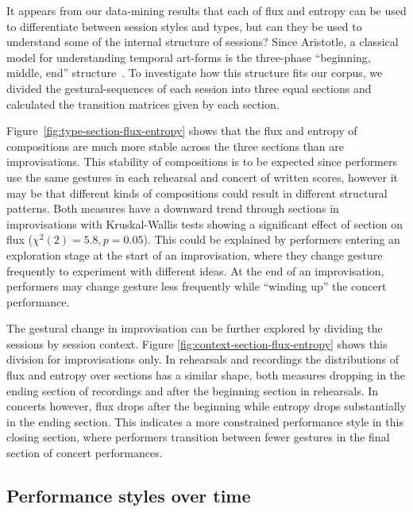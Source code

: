 \documentclass{sigchi}
\begin{document}
It appears from our data-mining results that each of flux and entropy can be used to
differentiate between session styles and types, but can they be
used to understand some of the internal structure of sessions? Since Aristotle, a
classical model for understanding temporal art-forms is the three-phase
``beginning, middle, end'' structure~\cite{Aristotle:350rt}. To
investigate how this structure fits our corpus, we divided the
gestural-sequences of each session into three equal sections and calculated the
transition matrices given by each section.

Figure~\ref{fig:type-section-flux-entropy} shows that the flux and
entropy of compositions are much more stable across the three sections than  are
improvisations. This stability of compositions is to be
expected since performers use the same gestures in each rehearsal and
concert of written scores, however it may be that different
kinds of compositions could result in different structural
patterns. Both measures have a downward trend through sections in
improvisations with Kruskal-Wallis tests showing a significant effect
of section on flux ($\chi^2(2)=5.8, p=0.05$). This could be explained
by performers entering an exploration stage at the start of an
improvisation, where they change gesture frequently to experiment with
different ideas. At the end of an improvisation, performers may change
gesture less frequently while ``winding up'' the concert performance.

The gestural change in improvisation can be further explored by
dividing the sessions by session context. Figure
\ref{fig:context-section-flux-entropy} shows this division for
improvisations only. In rehearsals and recordings the distributions of
flux and entropy over sections has a similar shape, both measures dropping
in the ending section of recordings and after the beginning section in
rehearsals. In concerts however, flux drops after the beginning
while entropy drops substantially in the ending section. This
indicates a more constrained performance style in this closing
section, where performers transition between fewer gestures in the
final section of concert performances.

\subsection{Performance styles over time}
\end{document}
